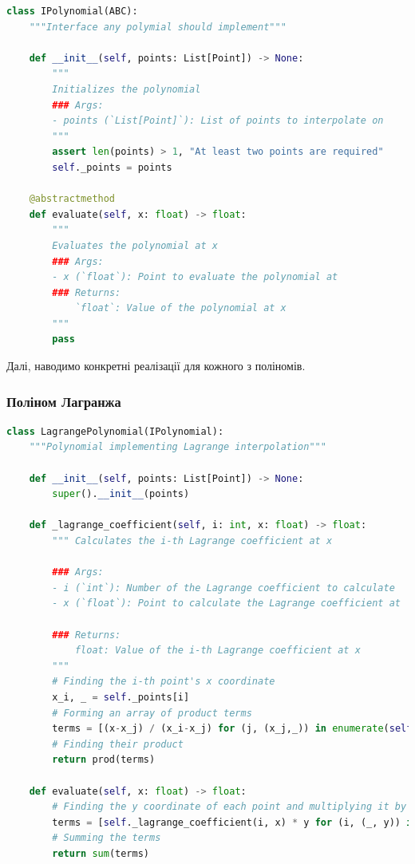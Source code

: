 \documentclass[12pt]{extarticle}
\begin{document}
\begin{lstlisting}[language=Python, caption=Інтерфейс для поліномів]
class IPolynomial(ABC):
    """Interface any polymial should implement"""
    
    def __init__(self, points: List[Point]) -> None:
        """ 
        Initializes the polynomial
        ### Args:
        - points (`List[Point]`): List of points to interpolate on
        """
        assert len(points) > 1, "At least two points are required"
        self._points = points
    
    @abstractmethod
    def evaluate(self, x: float) -> float:
        """
        Evaluates the polynomial at x
        ### Args:
        - x (`float`): Point to evaluate the polynomial at
        ### Returns:
            `float`: Value of the polynomial at x
        """
        pass
\end{lstlisting}

Далі, наводимо конкретні реалізації для кожного з поліномів.

\subsubsection{Поліном Лагранжа}

\begin{lstlisting}[language=Python, caption=Реалізація полінома Лагранжа]
class LagrangePolynomial(IPolynomial):
    """Polynomial implementing Lagrange interpolation"""
    
    def __init__(self, points: List[Point]) -> None:
        super().__init__(points)
        
    def _lagrange_coefficient(self, i: int, x: float) -> float:
        """ Calculates the i-th Lagrange coefficient at x

        ### Args:
        - i (`int`): Number of the Lagrange coefficient to calculate
        - x (`float`): Point to calculate the Lagrange coefficient at

        ### Returns:
            float: Value of the i-th Lagrange coefficient at x
        """
        # Finding the i-th point's x coordinate
        x_i, _ = self._points[i]
        # Forming an array of product terms
        terms = [(x-x_j) / (x_i-x_j) for (j, (x_j,_)) in enumerate(self._points) if i!=j]
        # Finding their product
        return prod(terms)
        
    def evaluate(self, x: float) -> float:
        # Finding the y coordinate of each point and multiplying it by the corresponding Lagrange coefficient
        terms = [self._lagrange_coefficient(i, x) * y for (i, (_, y)) in enumerate(self._points)]
        # Summing the terms
        return sum(terms)
\end{lstlisting}
\end{document}

